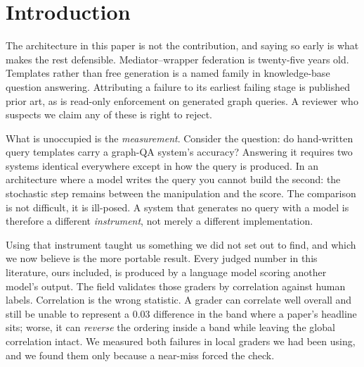 \documentclass{article}
\newcommand{\claimref}[1]{\iftoggle{trace}{\,{\scriptsize\textcolor{gray}{\texttt{<#1>}}}}{}}
\begin{document}
\section{Introduction}
\label{sec:intro}

The architecture in this paper is not the contribution, and saying so early is
what makes the rest defensible. Mediator--wrapper federation is twenty-five years
old. Templates rather than free generation is a named family in knowledge-base
question answering. Attributing a failure to its earliest failing stage is
published prior art, as is read-only enforcement on generated graph
queries.\claimref{D-027} A reviewer who suspects we claim any of these is right
to reject.

What is unoccupied is the \emph{measurement}. Consider the question: do
hand-written query templates carry a graph-QA system's accuracy? Answering it
requires two systems identical everywhere except in how the query is produced. In
an architecture where a model writes the query you cannot build the second: the
stochastic step remains between the manipulation and the score. The comparison is
not difficult, it is ill-posed. A system that generates no query with a model is
therefore a different \emph{instrument}, not merely a different implementation.

Using that instrument taught us something we did not set out to find, and which
we now believe is the more portable result. Every judged number in this
literature, ours included, is produced by a language model scoring another
model's output. The field validates those graders by correlation against human
labels. Correlation is the wrong statistic. A grader can correlate well overall
and still be unable to represent a $0.03$ difference in the band where a paper's
headline sits; worse, it can \emph{reverse} the ordering inside a band while
leaving the global correlation intact. We measured both failures in local graders
we had been using, and we found them only because a near-miss forced the check.
\end{document}
